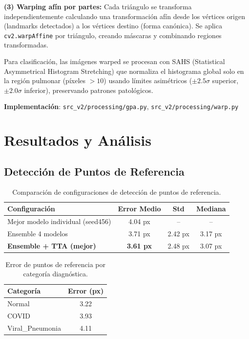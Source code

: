 \documentclass[12pt,a4paper]{article}
\newcommand{\code}[1]{\texttt{#1}}
\begin{document}
\textbf{(3) Warping afín por partes:} Cada triángulo se transforma independientemente calculando una transformación afín desde los vértices origen (landmarks detectados) a los vértices destino (forma canónica). Se aplica \code{cv2.warpAffine} por triángulo, creando máscaras y combinando regiones transformadas.

Para clasificación, las imágenes warped se procesan con SAHS (Statistical Asymmetrical Histogram Stretching) que normaliza el histograma global solo en la región pulmonar (píxeles $>10$) usando límites asimétricos ($\pm 2.5\sigma$ superior, $\pm 2.0\sigma$ inferior), preservando patrones patológicos.

\textbf{Implementación}: \code{src\_v2/processing/gpa.py}, \code{src\_v2/processing/warp.py}

\section{Resultados y Análisis}

\subsection{Detección de Puntos de Referencia}

\begin{table}[H]
\centering
\begin{tabular}{lccc}
\toprule
\textbf{Configuración} & \textbf{Error Medio} & \textbf{Std} & \textbf{Mediana} \\
\midrule
Mejor modelo individual (seed456) & 4.04 px & -- & -- \\
Ensemble 4 modelos & 3.71 px & 2.42 px & 3.17 px \\
\textbf{Ensemble + TTA (mejor)} & \textbf{3.61 px} & 2.48 px & 3.07 px \\
\bottomrule
\end{tabular}
\caption{Comparación de configuraciones de detección de puntos de referencia.}
\end{table}

\begin{table}[H]
\centering
\begin{tabular}{lc}
\toprule
\textbf{Categoría} & \textbf{Error (px)} \\
\midrule
Normal & 3.22 \\
COVID & 3.93 \\
Viral\_Pneumonia & 4.11 \\
\bottomrule
\end{tabular}
\caption{Error de puntos de referencia por categoría diagnóstica.}
\end{table}
\end{document}
